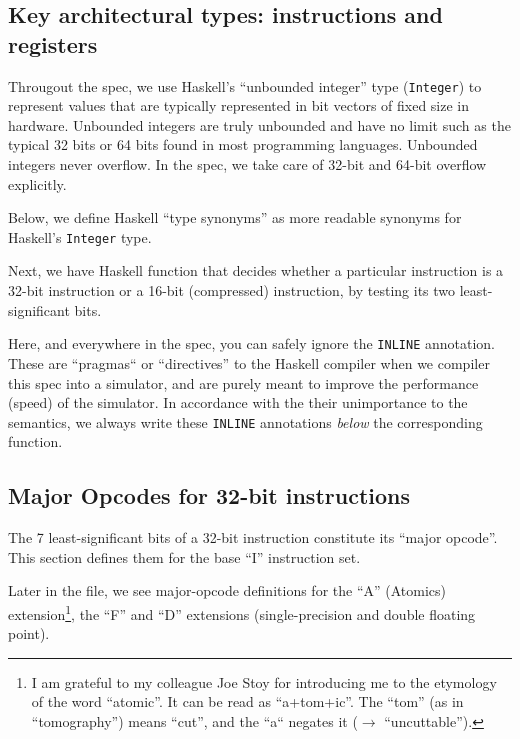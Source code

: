 \documentclass[11pt]{article}
\begin{document}
\subsection{Key architectural types: instructions and registers}

Througout the spec, we use Haskell's ``unbounded integer'' type
(\verb'Integer') to represent values that are typically represented in
bit vectors of fixed size in hardware.  Unbounded integers are truly
unbounded and have no limit such as the typical 32 bits or 64 bits
found in most programming languages.  Unbounded integers never
overflow. In the spec, we take care of 32-bit and 64-bit overflow
explicitly.

Below, we define Haskell ``type synonyms'' as more readable synonyms
for Haskell's {\tt Integer} type.



Next, we have Haskell function that decides whether a particular
instruction is a 32-bit instruction or a 16-bit (compressed)
instruction, by testing its two least-significant bits.



Here, and everywhere in the spec, you can safely ignore the
\verb|INLINE| annotation.  These are ``pragmas`` or ``directives'' to
the Haskell compiler when we compiler this spec into a simulator, and
are purely meant to improve the performance (speed) of the simulator.
In accordance with the their unimportance to the semantics, we always
write these \verb|INLINE| annotations \emph{below} the corresponding
function.


\subsection{Major Opcodes for 32-bit instructions}

The 7 least-significant bits of a 32-bit instruction constitute its
``major opcode''.  This section defines them for the base ``I''
instruction set.



Later in the file, we see major-opcode definitions for the ``A''
(Atomics) extension\footnote{I am grateful to my colleague Joe Stoy
for introducing me to the etymology of the word ``atomic''.  It can be
read as ``a+tom+ic''.  The ``tom'' (as in ``tomography'') means
``cut'', and the ``a`` negates it ($\rightarrow$ ``uncuttable'').}, the ``F'' and
``D'' extensions (single-precision and double floating point).
\end{document}
